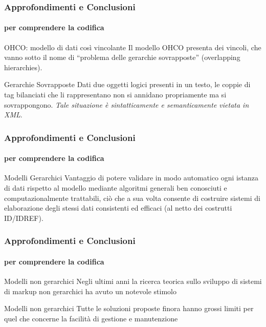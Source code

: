\begin{frame}
	\frametitle{Approfondimenti e Conclusioni}
	\framesubtitle{per comprendere la codifica}
	\addtocounter{nframe}{1}

	\begin{block}{OHCO: modello di dati così vincolante}
		Il modello OHCO presenta dei vincoli, che vanno sotto il nome di ``problema delle gerarchie sovrapposte'' (overlapping hierarchies).
	 \end{block}
	 
	 \begin{block}{Gerarchie Sovrapposte}
		Dati due oggetti logici presenti in un testo, le coppie di tag bilanciati che li rappresentano non si annidano propriamente ma si sovrappongono. \textit{Tale situazione è sintatticamente e semanticamente vietata in XML}.
 	\end{block}
   
\end{frame}

\begin{frame}
	\frametitle{Approfondimenti e Conclusioni}
	\framesubtitle{per comprendere la codifica}
	\addtocounter{nframe}{1}

	\begin{block}{Modelli Gerarchici}
		Vantaggio di potere validare in modo automatico ogni istanza di dati rispetto al modello mediante algoritmi generali ben conosciuti e computazionalmente trattabili, ciò che a sua volta consente di costruire sistemi di elaborazione degli stessi dati consistenti ed efficaci (al netto dei costrutti ID/IDREF).
	 \end{block}
	 
   
\end{frame}

\begin{frame}
	\frametitle{Approfondimenti e Conclusioni}
	\framesubtitle{per comprendere la codifica}
	\addtocounter{nframe}{1}

	\begin{block}{Modelli non gerarchici}
		Negli ultimi anni la ricerca teorica sullo sviluppo di sistemi di markup non gerarchici ha avuto un notevole stimolo
	 \end{block}

	 \begin{block}{Modelli non gerarchici}
		Tutte le soluzioni proposte finora hanno grossi limiti per quel che concerne la facilità di gestione e manutenzione

	 \end{block}
	 
   
\end{frame}


